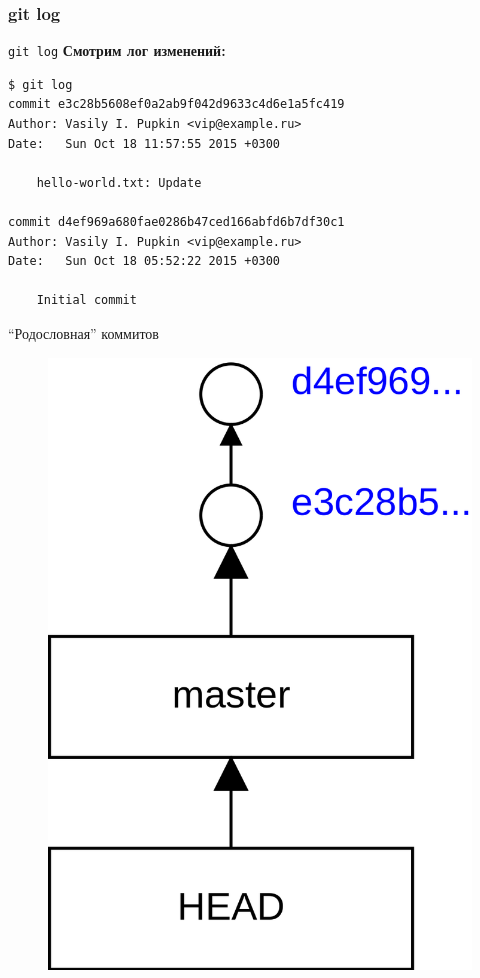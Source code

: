\documentclass[presentation]{beamer}
\begin{document}
\subsubsection{git log}

\begin{frame}[fragile]{\texttt{git log}}
  \textbf{Смотрим лог изменений:}
\begin{verbatim}
$ git log
commit e3c28b5608ef0a2ab9f042d9633c4d6e1a5fc419
Author: Vasily I. Pupkin <vip@example.ru>
Date:   Sun Oct 18 11:57:55 2015 +0300

    hello-world.txt: Update

commit d4ef969a680fae0286b47ced166abfd6b7df30c1
Author: Vasily I. Pupkin <vip@example.ru>
Date:   Sun Oct 18 05:52:22 2015 +0300

    Initial commit
\end{verbatim}
\end{frame}

\begin{frame}{``Родословная'' коммитов}
  \begin{figure}[htb]
    \centering
    \includegraphics[height=.9\textheight]{git-basics-1}
  \end{figure}
\end{frame}
\end{document}
